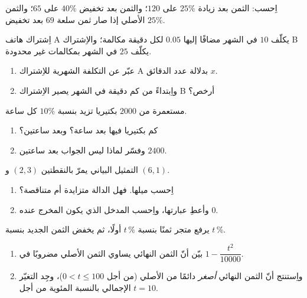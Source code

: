\begin{exercise}[$\star\star$]\label{exo:g9:linfunc:6}
اِحسب: الثمن بعد زيادة $25\%$ على $120$؛ والثمن بعد تخفيض
$40\%$ على $65$؛ والثمن الأصلي إذا صار ثمن سلعة $69$ بعد تخفيض
$25\%$.
\end{exercise}

\begin{exercise}[$\star\star$]\label{exo:g9:linfunc:7}
اِشتراك هاتف A يكلّف $10$ في الشهر مضافًا إليها $0.05$ لكل دقيقة
مكالمة؛ والاِشتراك B يكلّف $25$ في الشهر بمكالمات غير محدودة.
\begin{enumerate}
  \item عبّر عن التكلفة الشهرية للاِشتراك A بدلالة عدد الدقائق
        $x$.
  \item واِبتداءً من كم دقيقة في الشهر يصير الاِشتراك B أرخص؟
\end{enumerate}
\end{exercise}

\begin{exercise}[$\star\star$]\label{exo:g9:linfunc:8}
مستعمرة من $2000$ بكتيريا تزيد بنسبة $10\%$ كل ساعة.
\begin{enumerate}
  \item كم بكتيريا فيها بعد ساعة؟ وبعد ساعتين؟
  \item وفسّر لماذا ليس الجواب بعد ساعتين $2400$.
\end{enumerate}
\end{exercise}

\begin{exercise}[$\star\star$]\label{exo:g9:linfunc:9}
التمثيل البياني  يمرّ بالنقطتين $(2, 3)$
و $(6, 1)$.
\begin{enumerate}
  \item اِحسب ميلها. فهل الدالة متزايدة أم متناقصة؟
  \item وأعطِ عبارتها، واِحسب المدخل الذي يكون المخرج عنده
        $0$.
\end{enumerate}
\end{exercise}

\begin{exercise}[$\star\star\star$]\label{exo:g9:linfunc:10}
يرفع متجر ثمنًا بنسبة $t\,\%$ أولًا، ثم يخفض الثمن الجديد بنسبة
$t\,\%$.
\begin{enumerate}
  \item بيّن أنّ الثمن النهائي يساوي الثمن الأصلي مضروبًا في
        $1 - \dfrac{t^2}{10000}$.
  \item واِستنتج أنّ الثمن النهائي \emph{أصغر} دائمًا من الأصلي
        (من أجل $0 < t \leq 100$)، وجِد التغيّر الإجمالي بالنسبة
        المئوية من أجل $t = 10$.
\end{enumerate}
\end{exercise}

